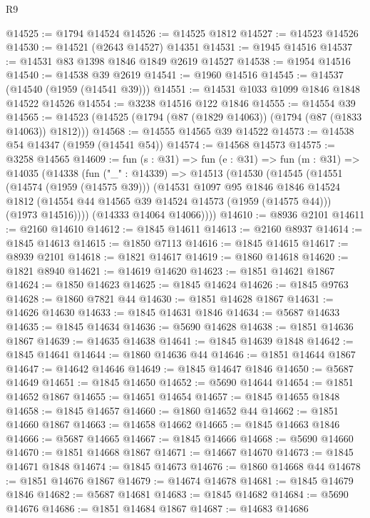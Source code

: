 \begin{lexlean}{R9}
\begin{coremodule}
@14525 := @1794 @14524
@14526 := @14525 @1812
@14527 := @14523 @14526
@14530 := @14521 (@2643 @14527) @14351
@14531 := @1945 @14516
@14537 := @14531 @83 @1398 @1846 @1849 @2619 @14527
@14538 := @1954 @14516
@14540 := @14538 @39 @2619
@14541 := @1960 @14516
@14545 := @14537 (@14540 (@1959 (@14541 @39)))
@14551 := @14531 @1033 @1099 @1846 @1848 @14522 @14526
@14554 := @3238 @14516 @122 @1846
@14555 := @14554 @39
@14565 := @14523 (@14525 (@1794 (@87 (@1829 @14063)) (@1794 (@87 (@1833 @14063)) @1812)))
@14568 := @14555 @14565 @39 @14522
@14573 := @14538 @54 @14347 (@1959 (@14541 @54))
@14574 := @14568 @14573
@14575 := @3258 @14565
@14609 := fun (s : @31) =>
  fun (e : @31) =>
  fun (m : @31) =>
  @14035
    (@14338
      (fun ("_" : @14339) =>
      @14513
        (@14530
          (@14545
            (@14551
              (@14574 (@1959 (@14575 @39)))
              (@14531
                @1097
                @95
                @1846
                @1846
                @14524
                @1812
                (@14554 @44 @14565 @39 @14524 @14573 (@1959 (@14575 @44)))
                (@1973 @14516))))
          (@14333 @14064 @14066))))
@14610 := @8936 @2101
@14611 := @2160 @14610
@14612 := @1845 @14611
@14613 := @2160 @8937
@14614 := @1845 @14613
@14615 := @1850 @7113
@14616 := @1845 @14615
@14617 := @8939 @2101
@14618 := @1821 @14617
@14619 := @1860 @14618
@14620 := @1821 @8940
@14621 := @14619 @14620
@14623 := @1851 @14621 @1867
@14624 := @1850 @14623
@14625 := @1845 @14624
@14626 := @1845 @9763
@14628 := @1860 @7821 @44
@14630 := @1851 @14628 @1867
@14631 := @14626 @14630
@14633 := @1845 @14631 @1846
@14634 := @5687 @14633
@14635 := @1845 @14634
@14636 := @5690 @14628
@14638 := @1851 @14636 @1867
@14639 := @14635 @14638
@14641 := @1845 @14639 @1848
@14642 := @1845 @14641
@14644 := @1860 @14636 @44
@14646 := @1851 @14644 @1867
@14647 := @14642 @14646
@14649 := @1845 @14647 @1846
@14650 := @5687 @14649
@14651 := @1845 @14650
@14652 := @5690 @14644
@14654 := @1851 @14652 @1867
@14655 := @14651 @14654
@14657 := @1845 @14655 @1848
@14658 := @1845 @14657
@14660 := @1860 @14652 @44
@14662 := @1851 @14660 @1867
@14663 := @14658 @14662
@14665 := @1845 @14663 @1846
@14666 := @5687 @14665
@14667 := @1845 @14666
@14668 := @5690 @14660
@14670 := @1851 @14668 @1867
@14671 := @14667 @14670
@14673 := @1845 @14671 @1848
@14674 := @1845 @14673
@14676 := @1860 @14668 @44
@14678 := @1851 @14676 @1867
@14679 := @14674 @14678
@14681 := @1845 @14679 @1846
@14682 := @5687 @14681
@14683 := @1845 @14682
@14684 := @5690 @14676
@14686 := @1851 @14684 @1867
@14687 := @14683 @14686

\end{coremodule}
\end{lexlean}

